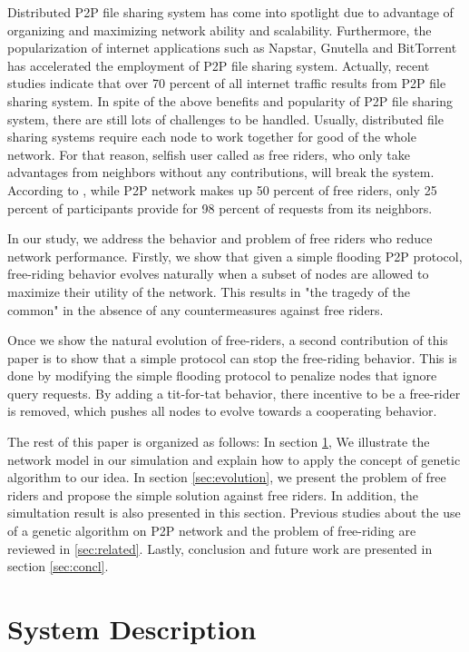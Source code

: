 \documentclass[12pt,journal,draftcls,letterpaper,onecolumn]{IEEEtran}
\begin{document}
Distributed P2P file sharing system has come into spotlight due to advantage of organizing
and maximizing network ability and scalability. Furthermore, the popularization of internet
applications such as Napstar\cite{napster}, Gnutella\cite{gnutella} and BitTorrent\cite{bittorrent} has accelerated the
employment of P2P file sharing system. Actually, recent studies indicate that over
70 percent of all internet traffic results from P2P file sharing system. In spite of the above benefits
and popularity of P2P file sharing system, there are still lots of challenges to be handled.
Usually, distributed file sharing systems require each node to work together for good of the
whole network. For that reason, selfish user called as free riders, who only take advantages
from neighbors without any contributions, will break the system. According to \cite{hd:belltoll}, while P2P
network makes up 50 percent of free riders, only 25 percent of participants provide for 98
percent of requests from its neighbors.

In our study, we address the behavior and problem of free riders who reduce network
performance. Firstly, we show that given a simple flooding P2P protocol,
free-riding behavior evolves naturally when a subset of nodes are allowed to
maximize their utility of the network.  
This results in "the tragedy of the common\cite{tc:tragedy}" in the absence of
any countermeasures against free riders.

Once we show the natural evolution of free-riders, a second
contribution of this paper is to show that a simple protocol can stop the
free-riding behavior.  This is done by modifying the simple flooding protocol
to penalize nodes that ignore query requests.  By adding a tit-for-tat
behavior, there incentive to be a free-rider is removed, which pushes all
nodes to evolve towards a cooperating behavior.

The rest of this paper is organized as follows: In section \ref{sec:system}, We illustrate the network model 
in our simulation and explain how to apply the concept of genetic algorithm to our idea. In section \ref{sec:evolution}, 
we present the problem of free riders and propose the simple solution against free riders. In addition,
the simultation result is also presented in this section. Previous studies about the use of a genetic algorithm 
on P2P network and the problem of free-riding are reviewed in \ref{sec:related}. Lastly, conclusion and future work 
are presented in section \ref{sec:concl}.

\section{System Description}\label{sec:system}
\end{document}
